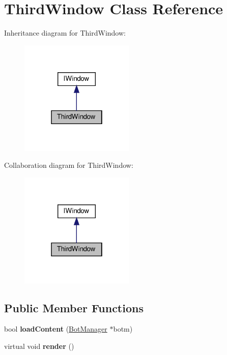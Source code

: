 \hypertarget{classThirdWindow}{}\section{Third\+Window Class Reference}
\label{classThirdWindow}


Inheritance diagram for Third\+Window\+:
\nopagebreak
\begin{figure}[H]
\begin{center}
\leavevmode
\includegraphics[width=154pt]{classThirdWindow__inherit__graph}
\end{center}
\end{figure}


Collaboration diagram for Third\+Window\+:
\nopagebreak
\begin{figure}[H]
\begin{center}
\leavevmode
\includegraphics[width=154pt]{classThirdWindow__coll__graph}
\end{center}
\end{figure}
\subsection*{Public Member Functions}
\begin{DoxyCompactItemize}
\item 
\mbox{\label{classThirdWindow_aafbbf2feb20bccd9ef33cad0ff495663}} 
bool {\bfseries load\+Content} (\hyperlink{classBotManager}{Bot\+Manager} $\ast$botm)
\item 
\mbox{\label{classThirdWindow_a2ed049ff8701666544dfd9475fbaf4d8}} 
virtual void {\bfseries render} ()
\end{DoxyCompactItemize}
